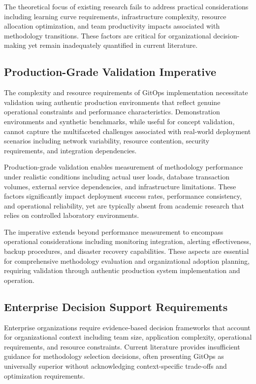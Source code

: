 The theoretical focus of existing research fails to address practical considerations including learning curve requirements, infrastructure complexity, resource allocation optimization, and team productivity impacts associated with methodology transitions. These factors are critical for organizational decision-making yet remain inadequately quantified in current literature.

\subsection{Production-Grade Validation Imperative}
The complexity and resource requirements of GitOps implementation necessitate validation using authentic production environments that reflect genuine operational constraints and performance characteristics. Demonstration environments and synthetic benchmarks, while useful for concept validation, cannot capture the multifaceted challenges associated with real-world deployment scenarios including network variability, resource contention, security requirements, and integration dependencies.

Production-grade validation enables measurement of methodology performance under realistic conditions including actual user loads, database transaction volumes, external service dependencies, and infrastructure limitations. These factors significantly impact deployment success rates, performance consistency, and operational reliability, yet are typically absent from academic research that relies on controlled laboratory environments.

The imperative extends beyond performance measurement to encompass operational considerations including monitoring integration, alerting effectiveness, backup procedures, and disaster recovery capabilities. These aspects are essential for comprehensive methodology evaluation and organizational adoption planning, requiring validation through authentic production system implementation and operation.

\subsection{Enterprise Decision Support Requirements}
Enterprise organizations require evidence-based decision frameworks that account for organizational context including team size, application complexity, operational requirements, and resource constraints. Current literature provides insufficient guidance for methodology selection decisions, often presenting GitOps as universally superior without acknowledging context-specific trade-offs and optimization requirements.

